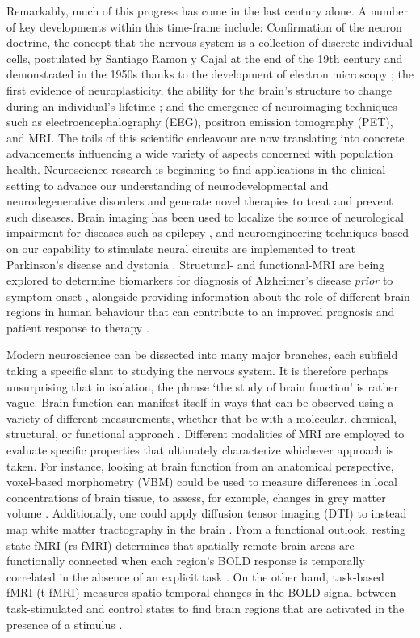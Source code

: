 Remarkably, much of this progress has come in the last century alone. A number of key developments within this time-frame include: Confirmation of the neuron doctrine, the concept that the nervous system is a collection of discrete individual cells, postulated by Santiago Ramon y Cajal at the end of the 19th century and demonstrated in the 1950s thanks to the development of electron microscopy \citep{Lopez-Munoz2006-zk}; the first evidence of neuroplasticity, the ability for the brain's structure to change during an individual's lifetime \citep{Diamond1964-cu, Bennett1964-vx}; and the emergence of neuroimaging techniques such as electroencephalography (EEG), positron emission tomography (PET), and MRI. The toils of this scientific endeavour are now translating into concrete advancements influencing a wide variety of aspects concerned with population health. Neuroscience research is beginning to find applications in the clinical setting to advance our understanding of neurodevelopmental and neurodegenerative disorders and generate novel therapies to treat and prevent such diseases. Brain imaging has been used to localize the source of neurological impairment for diseases such as epilepsy \citep{Stacey2008-qx}, and neuroengineering techniques based on our capability to stimulate neural circuits are implemented to treat Parkinson's disease \citep{Kalia2013-bv} and dystonia \citep{Fox2015-ds}. Structural- and functional-MRI are being explored to determine biomarkers for diagnosis of Alzheimer's disease \textit{prior} to symptom onset \citep{Sperling2014-sy, McEvoy2009-zx}, alongside providing information about the role of different brain regions in human behaviour that can contribute to an improved prognosis and patient response to therapy \citep{Matthews2006-sl}.  

Modern neuroscience can be dissected into many major branches, each subfield taking a specific slant to studying the nervous system. It is therefore perhaps unsurprising that in isolation, the phrase `the study of brain function' is rather vague. Brain function can manifest itself in ways that can be observed using a variety of different measurements, whether that be with a molecular, chemical, structural, or functional approach \citep{Hargreaves2012-dz}. Different modalities of MRI are employed to evaluate specific properties that ultimately characterize whichever approach is taken. For instance, looking at brain function from an anatomical perspective, voxel-based morphometry (VBM) could be used to measure differences in local concentrations of brain tissue, to assess, for example, changes in grey matter volume \citep{Mechelli2005-dn}. Additionally, one could apply diffusion tensor imaging (DTI) to instead map white matter tractography in the brain \citep{Alexander2007-ut, Soares2013-mh}. From a functional outlook, resting state fMRI (rs-fMRI) determines that spatially remote brain areas are functionally connected when each region's BOLD response is temporally correlated in the absence of an explicit task \citep{Lee2013-kn}. On the other hand, task-based fMRI (t-fMRI) measures spatio-temporal changes in the BOLD signal between task-stimulated and control states to find brain regions that are activated in the presence of a stimulus \citep{Glover2011-at}. 

